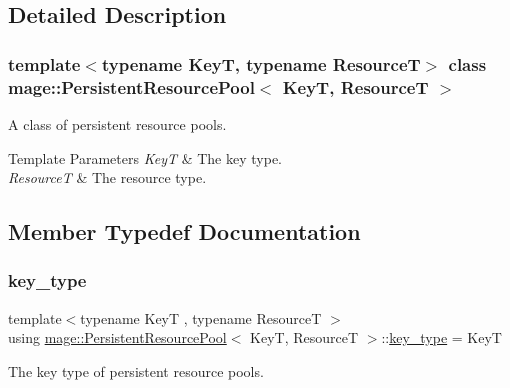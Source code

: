 \subsection{Detailed Description}
\subsubsection*{template$<$typename KeyT, typename ResourceT$>$\newline
class mage\+::\+Persistent\+Resource\+Pool$<$ Key\+T, Resource\+T $>$}

A class of persistent resource pools.


\begin{DoxyTemplParams}{Template Parameters}
{\em KeyT} & The key type. \\
\hline
{\em ResourceT} & The resource type. \\
\hline
\end{DoxyTemplParams}


\subsection{Member Typedef Documentation}
\mbox{\label{classmage_1_1_persistent_resource_pool_a8041d9d11d2307efc6d5b6dd43074e0c}} 
\subsubsection{\texorpdfstring{key\+\_\+type}{key\_type}}
{\footnotesize\ttfamily template$<$typename KeyT , typename ResourceT $>$ \\
using \mbox{\hyperlink{classmage_1_1_persistent_resource_pool}{mage\+::\+Persistent\+Resource\+Pool}}$<$ KeyT, ResourceT $>$\+::\mbox{\hyperlink{classmage_1_1_persistent_resource_pool_a8041d9d11d2307efc6d5b6dd43074e0c}{key\+\_\+type}} =  KeyT}

The key type of persistent resource pools. \mbox{\label{classmage_1_1_persistent_resource_pool_a9215c5816fc45ab5f772625df2a8a60c}} 
